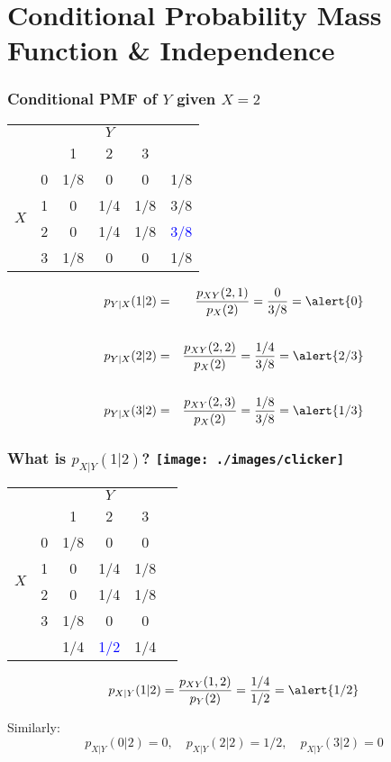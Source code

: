 \section{Conditional Probability Mass Function \& Independence}
\begin{frame}
\frametitle{Conditional PMF of $Y$ given $X = 2$}

\begin{table}
\begin{tabular}{|cc|ccc|c|}
\hline
&&\multicolumn{3}{c|}{$Y$}&\\
&&1 & 2&3&\\
\hline
\multirow{4}{*}{$X$}
&0& \multicolumn{1}{|c}{1/8} & 0& 0&1/8\\
&1& \multicolumn{1}{|c}{0} & 1/4&1/8&3/8\\
&2& \multicolumn{1}{|c}{\alert{0}} & \alert{1/4}&\alert{1/8}&\textcolor{blue}{3/8}\\
&3& \multicolumn{1}{|c}{1/8} & 0&0&1/8\\
\hline
\end{tabular}
\end{table}

\small
\begin{eqnarray*}
	p_{Y|X}(1|2) &=& \frac{p_{XY}(2,1)}{p_X(2)} = \frac{0}{3/8} =\alert{0}\\ \\
	p_{Y|X}(2|2) &=&\frac{p_{XY}(2,2)}{p_X(2)}= \frac{1/4}{3/8} =\alert{2/3} \\ \\ 
	 p_{Y|X}(3|2) &=&\frac{p_{XY}(2,3)}{p_X(2)} = \frac{1/8}{3/8} = \alert{1/3}
\end{eqnarray*}


\end{frame}
\begin{frame}
\frametitle{What is $p_{X|Y}(1|2)$? \hfill \texttt{[image: ./images/clicker]}}
\small
\begin{table}
\begin{tabular}{|cc|ccc|c|}
\hline
&&\multicolumn{3}{c|}{$Y$}&\\
&&1 & 2&3&\\
\hline
\multirow{4}{*}{$X$}
&0& \multicolumn{1}{|c}{1/8} & \alert{0}&0&\\
&1& \multicolumn{1}{|c}{0} & \alert{1/4}&1/8&\\
&2& \multicolumn{1}{|c}{0} & \alert{1/4}&1/8&\\
&3& \multicolumn{1}{|c}{1/8} & \alert{0}&0&\\
\hline 
&&1/4&\textcolor{blue}{1/2}&1/4&\\
\hline
\end{tabular}
\end{table}

\pause
\begin{equation*}
	p_{X|Y}(1|2) =\frac{p_{XY}(1,2)}{p_Y(2)}=\frac{1/4}{1/2}= \alert{1/2}
\end{equation*}

  \pause

Similarly: 
$$p_{X|Y}(0|2)=0, \quad p_{X|Y}(2|2)=1/2, \quad p_{X|Y}(3|2)= 0$$


\end{frame}

